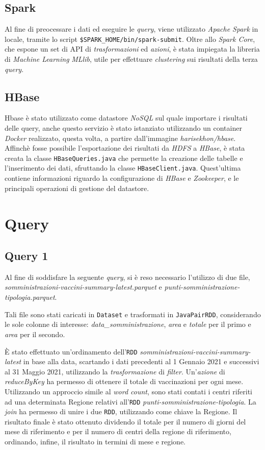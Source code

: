 \documentclass[conference]{IEEEtran}
\begin{document}
\subsection*{\textbf{Spark}}
Al fine di preocessare i dati ed eseguire le \emph{query}, viene utilizzato \emph{Apache Spark} in locale, tramite lo script \texttt{\$SPARK\_HOME/bin/spark-submit}. Oltre allo \emph{Spark Core}, che espone un set di API di \emph{trasformazioni} ed \emph{azioni}, \`{e} stata impiegata la libreria di \emph{Machine Learning} \emph{MLlib}, utile per effettuare \emph{clustering} sui risultati della terza \emph{query}. 

\subsection*{\textbf{HBase}}
Hbase \`{e} stato utilizzato come datastore \emph{NoSQL} sul quale
importare i risultati delle ​query,​ anche questo servizio \`{e}
stato istanziato utilizzando un ​container \emph{Docker} realizzato,
questa volta, a partire dall'immagine​ \emph{harisekhon/hbase}​. Affinch\`{e} fosse possibile
l'esportazione dei risultati da \emph{HDFS} a \emph{HBase}, \`{e} stata creata la classe \texttt{HBaseQueries.java} che permette la creazione delle tabelle e l'inserimento dei dati, sfruttando la classe \texttt{HBaseClient.java}. Quest'ultima contiene informazioni riguardo la configurazione di \emph{HBase} e \emph{Zookeeper}, e le principali operazioni di gestione del datastore.\\
\section{\textbf{Query}}
\subsection*{\textbf{Query 1}}
Al fine di soddisfare la seguente \emph{query}, si \`{e} reso necessario l'utilizzo di due file, \textit{somministrazioni-vaccini-summary-latest.parquet} e \textit{punti-somministrazione-tipologia.parquet}.\par
Tali file sono stati caricati in \texttt{Dataset} e trasformati in \texttt{JavaPairRDD}, considerando le sole colonne di interesse: \emph{data\_somministrazione}, \emph{area} e \emph{totale} per il primo e \emph{area} per il secondo.\par \`{E} stato effettuato un'ordinamento dell'\texttt{RDD} \textit{somministrazioni-vaccini-summary-latest} in base alla data, scartando i dati precedenti al 1 Gennaio 2021 e successivi al 31 Maggio 2021, utilizzando la \emph{trasformazione} di \emph{filter}. Un'\emph{azione} di \emph{reduceByKey} ha permesso di ottenere il totale di vaccinazioni per ogni mese. Utilizzando un approccio simile al \emph{word count}, sono stati contati i centri riferiti ad una determinata Regione relativi all'\texttt{RDD} \textit{punti-somministrazione-tipologia}. La \emph{join} ha permesso di unire i due \texttt{RDD}, utilizzando come chiave la Regione. Il risultato finale \`{e} stato ottenuto dividendo il totale per il numero di giorni del mese di riferimento e per il numero di centri della regione di riferimento, ordinando, infine, il risultato in termini di mese e regione.
\end{document}

